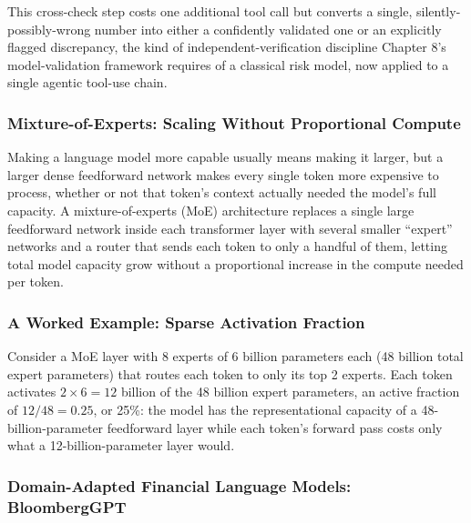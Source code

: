 \documentclass[../ai_in_finance]{subfiles}
\begin{document}
This cross-check step costs one additional tool call but converts a single, silently-possibly-wrong number into either a confidently validated one or an explicitly flagged discrepancy, the kind of independent-verification discipline Chapter 8's model-validation framework requires of a classical risk model, now applied to a single agentic tool-use chain.

\subsubsection*{Mixture-of-Experts: Scaling Without Proportional Compute}

Making a language model more capable usually means making it larger, but a larger dense feedforward network makes every single token more expensive to process, whether or not that token's context actually needed the model's full capacity. A mixture-of-experts (MoE) architecture replaces a single large feedforward network inside each transformer layer with several smaller ``expert'' networks and a router that sends each token to only a handful of them, letting total model capacity grow without a proportional increase in the compute needed per token.

\subsubsection*{A Worked Example: Sparse Activation Fraction}
Consider a MoE layer with 8 experts of 6 billion parameters each (48 billion total expert parameters) that routes each token to only its top 2 experts. Each token activates $2 \times 6 = 12$ billion of the 48 billion expert parameters, an active fraction of $12/48 = 0.25$, or 25\%: the model has the representational capacity of a 48-billion-parameter feedforward layer while each token's forward pass costs only what a 12-billion-parameter layer would.

\subsubsection*{Domain-Adapted Financial Language Models: BloombergGPT}
\end{document}
